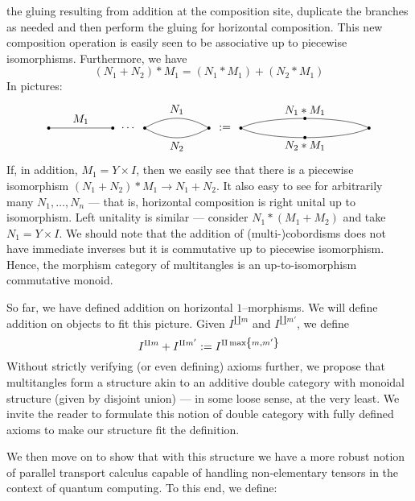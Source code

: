 \documentclass{amsart}
\renewcommand{\to}[1][]{\stackrel{#1}{\longrightarrow}}
\newcommand{\curly}[1]{\left\{ #1 \right\}}
\newcommand{\set}[2][]{\ifthenelse{\equal{#1}{}}
                                  {\curly{#2}}
                                  {\curly{#1\ \textbf{:}\ #2}}}
\newcommand{\vertinnersep}{1pt}
\newcommand{\colvert}[3]{
\node[circle, fill, inner sep=\vertinnersep, #1] at (#2) (#3) {};
}
\newcommand{\lblvert}[3]{
\node at (#1) (#2) {#3};
}
\numberwithin{thm}{section}
\theoremstyle{definition}
\begin{document}
the gluing resulting from addition at the composition site, duplicate the
branches as needed and then perform the gluing for horizontal composition. This
new composition operation is easily seen to be associative up to piecewise
isomorphisms. Furthermore, we have
\[
  (N_1 + N_2) * M_1 = (N_1 * M_1) + (N_2 * M_1)
\]
In pictures:
\[\begin{tikzpicture}
\colvert{black}{1, 0}{X}
\colvert{black}{3, 0}{Y}
\lblvert{3.5, 0}{glue}{$\cdots$}
\colvert{black}{4, 0}{YY}
\colvert{black}{6, 0}{Z}
\path
  (X)  edge   node[above]{$M_1$}   (Y)
  (YY) edge[bend left]   node[above]{$N_1$}  (Z)
  (YY) edge[bend right]  node[below]{$N_2$} (Z)
  ;
\lblvert{6.5, 0}{equals}{$:=$}
\colvert{black}{7, 0}{XX}
\colvert{black}{9, 0.30}{YYY}
\colvert{black}{9, -0.30}{YYYY}
\colvert{black}{11, 0}{ZZ}
\draw (XX) .. controls (7.5, 0.25) and (8.5, 0.30) .. (YYY);
\draw (YYY) .. controls (9.5, 0.30) and (10.5, 0.25) .. (ZZ);
\draw (XX) .. controls (7.5, -0.25) and (8.5, -0.30) .. (YYYY);
\draw (YYYY) .. controls (9.5, -0.30) and (10.5, -0.25) .. (ZZ);

\lblvert{9, 0.55}{NM}{$N_1 * M_1$}
\lblvert{9, -0.55}{NNMM}{$N_2 * M_1$}
\end{tikzpicture}\]
If, in addition, $M_1 = Y \times I$, then we easily see that there is a
piecewise isomorphism $(N_1 + N_2) * M_1 \to N_1 + N_2$. It also easy to see for
arbitrarily many $N_1, \dots, N_n$ --- that is, horizontal
composition is right unital up to isomorphism. Left unitality is similar ---
consider $N_1 * (M_1 + M_2)$ and take $N_1 = Y \times I$. We should note that
the addition of (multi-)cobordisms does not have immediate inverses but it is
commutative up to piecewise isomorphism. Hence, the morphism category of
multitangles is an up-to-isomorphism commutative monoid.

So far, we have defined addition on horizontal $1$--morphisms. We will define
addition on objects to fit this picture. Given $I^{\amalg m}$ and
$I^{\amalg m'}$, we define
\[
  I^{\amalg m} + I^{\amalg m'} := I^{\amalg \max\set{m, m'}}
\]
Without strictly verifying (or even defining) axioms further, we propose that
multitangles form a structure akin to an additive double category with
monoidal structure (given by disjoint union) --- in some loose sense, at the very
least. We invite the reader to formulate this notion of double category with
fully defined axioms to make our structure fit the definition.

We then move on to show that with this structure we have a more robust notion of
parallel transport calculus capable of handling non-elementary tensors in the
context of quantum computing. To this end, we define:
\end{document}
